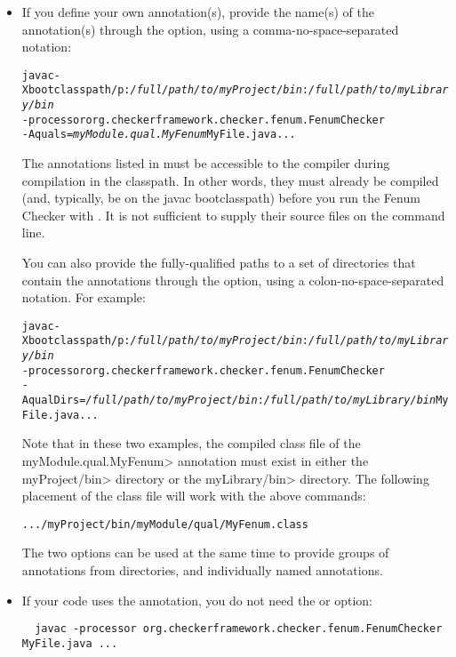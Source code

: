\begin{itemize}
  \item
If you define your own annotation(s), provide the name(s) of the annotation(s)
through the  option, using a comma-no-space-separated notation:

\begin{alltt}
  javac -Xbootclasspath/p:\textit{/full/path/to/myProject/bin}:\textit{/full/path/to/myLibrary/bin} \ttbs
        -processor org.checkerframework.checker.fenum.FenumChecker \ttbs
        -Aquals=\textit{myModule.qual.MyFenum} MyFile.java ...
\end{alltt}

The annotations listed in  must be accessible to
the compiler during compilation in the classpath.  In other words, they must
already be compiled (and, typically, be on the javac bootclasspath)
before you run the Fenum Checker with .  It
is not sufficient to supply their source files on the command line.

You can also provide the fully-qualified paths to a set of directories
that contain the annotations through the  option,
using a colon-no-space-separated notation. For example:

\begin{alltt}
  javac -Xbootclasspath/p:\textit{/full/path/to/myProject/bin}:\textit{/full/path/to/myLibrary/bin} \ttbs
        -processor org.checkerframework.checker.fenum.FenumChecker \ttbs
        -AqualDirs=\textit{/full/path/to/myProject/bin}:\textit{/full/path/to/myLibrary/bin} MyFile.java ...
\end{alltt}

Note that in these two examples, the compiled class file of the
\<myModule.qual.MyFenum> annotation must exist in either the \<myProject/bin>
directory or the \<myLibrary/bin> directory. The following placement of
the class file will work with the above commands:

\begin{alltt}
  .../myProject/bin/myModule/qual/MyFenum.class
\end{alltt}

The two options can be used at the same time to provide groups of annotations
from directories, and individually named annotations.

\item
If your code uses the  annotation, you do
not need the  or  option:

\begin{Verbatim}
  javac -processor org.checkerframework.checker.fenum.FenumChecker MyFile.java ...
\end{Verbatim}

\end{itemize}



